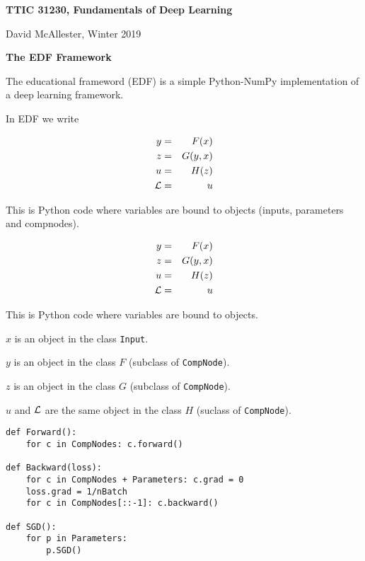 




{\Huge

  \centerline{\bf TTIC 31230, Fundamentals of Deep Learning}
  \bigskip
  \centerline{David McAllester, Winter 2019}
  \vfill
  \vfill
  \centerline{\bf The EDF Framework}
  \vfill
  \vfill


The educational frameword (EDF) is a simple Python-NumPy implementation of a deep learning framework.

\vfill
In EDF we write

\vfill
\begin{eqnarray*}
  y & = & F(x) \\
  z & = & G(y,x) \\
  u & = & H(z) \\
  {\cal L} &  = &  u
\end{eqnarray*}
\medskip

\vfill
This is Python code where variables are bound to objects (inputs, parameters and compnodes).


\begin{eqnarray*}
  y & = & F(x) \\
  z & = & G(y,x) \\
  u & = & H(z) \\
  {\cal L} &  = &  u
\end{eqnarray*}

\vfill
This is Python code where variables are bound to objects.

\vfill
$x$ is an object in the class {\tt Input}.

\vfill
$y$ is an object in the class $F$ (subclass of {\tt CompNode}).

\vfill
$z$ is an object in the class $G$ (subclass of {\tt CompNode}).

\medskip
$u$ and ${\cal L}$ are the same object in the class $H$ (suclass of {\tt CompNode}).


\begin{verbatim}
def Forward():
    for c in CompNodes: c.forward()

def Backward(loss):
    for c in CompNodes + Parameters: c.grad = 0
    loss.grad = 1/nBatch
    for c in CompNodes[::-1]: c.backward()

def SGD():
    for p in Parameters:
        p.SGD()
\end{verbatim}
\vfill


}
